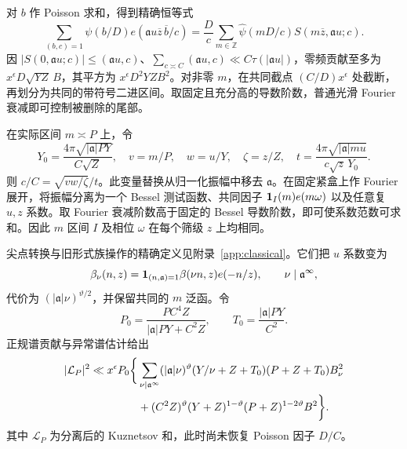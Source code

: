 对 $b$ 作 Poisson 求和，得到精确恒等式
\[
 \sum_{(b,c)=1}\psi(b/D)e(\mathfrak{a}u\overline z\,\overline b/c)
 =\frac Dc\sum_{m\in\mathbb Z}\widehat\psi(mD/c)
                   S(m\overline z,\mathfrak{a}u;c).
\]
因 $|S(0,\mathfrak{a}u;c)|\le(\mathfrak{a}u,c)$、$\sum_{c\asymp C}(\mathfrak{a}u,c)\ll C\tau(|\mathfrak{a}u|)$，零频贡献至多为 $x^\epsilon D\sqrt{YZ}\,B$，其平方为 $x^\epsilon D^2YZB^2$。对非零 $m$，在共同截点 $(C/D)x^\epsilon$ 处截断，再划分为共同的带符号二进区间。取固定且充分高的导数阶数，普通光滑 Fourier 衰减即可控制被删除的尾部。

在实际区间 $m\asymp P$ 上，令
\[
 Y_0=\frac{4\pi\sqrt{|\mathfrak{a}|PY}}{C\sqrt Z},\quad
 v=m/P,\quad w=u/Y,\quad \zeta=z/Z,\quad
 t=\frac{4\pi\sqrt{|\mathfrak{a}|mu}}{c\sqrt z\,Y_0}.
\]
则 $c/C=\sqrt{vw/\zeta}/t$。此变量替换从归一化振幅中移去 $\mathfrak{a}$。在固定紧盒上作 Fourier 展开，将振幅分离为一个 Bessel 测试函数、共同因子 $\mathbf 1_I(m)e(m\omega)$ 以及任意复 $u,z$ 系数。取 Fourier 衰减阶数高于固定的 Bessel 导数阶数，即可使系数范数可求和。因此 $m$ 区间 $I$ 及相位 $\omega$ 在每个筛级 $z$ 上均相同。

尖点转换与旧形式族操作的精确定义见附录~\ref{app:classical}。它们把 $u$ 系数变为
\begin{equation}
 \beta_\nu(n,z)=\mathbf 1_{(n,\mathfrak{a})=1}\beta(\nu n,z)e(-n/z),
 \qquad \nu\mid \mathfrak{a}^\infty,
 \label{ana:packet-coefficient}
\end{equation}
代价为 $(|\mathfrak{a}|\nu)^{\vartheta/2}$，并保留共同的 $m$ 泛函。令
\[
 P_0=\frac{PC^4Z}{|\mathfrak{a}|PY+C^2Z},\qquad T_0=\frac{|\mathfrak{a}|PY}{C^2}.
\]
正规谱贡献与异常谱估计给出
\begin{align}
 |\mathcal L_P|^2\ll x^\epsilon P_0\bigg\{
 &\sum_{\nu\mid \mathfrak{a}^\infty}(|\mathfrak{a}|\nu)^\vartheta
       (Y/\nu+Z+T_0)(P+Z+T_0)B_\nu^2\notag\\
 &+(C^2Z)^\vartheta(Y+Z)^{1-\vartheta}
                    (P+Z)^{1-2\vartheta}B^2\bigg\}.
 \label{ana:spectral-polynomial}
\end{align}
其中 $\mathcal L_P$ 为分离后的 Kuznetsov 和，此时尚未恢复 Poisson 因子 $D/C$。

